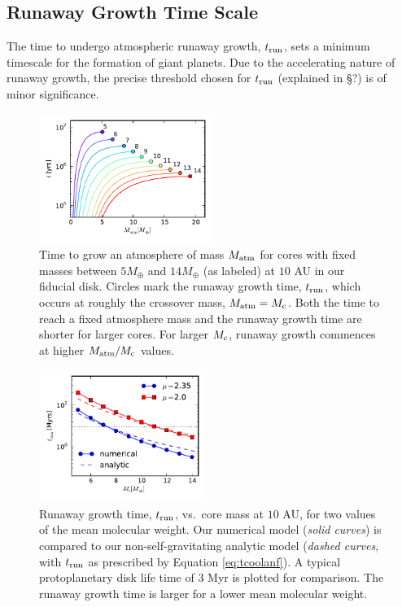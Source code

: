 \documentclass[apj, numberedappendix]{emulateapj}
\newcommand{\co}{_{\rm c}}
\begin{document}
\subsection{Runaway Growth Time Scale}
\label{sec:tcross}
The time to undergo atmospheric runaway growth, $t_{\rm run}$, sets a minimum timescale for the formation of giant planets.  Due to the accelerating nature of runaway growth, the precise threshold chosen for $t_{\rm run}$ (explained in \S ?) is of minor significance.

\begin{figure}[tb]
\hspace{-.1in}
\includegraphics[width=0.5\textwidth]{../../figs/ModelAtmospheres/RadSelfGravPoly/PaperFigs/cumul_coolingtime_vs_Matm_10au_mu235.pdf}
\caption{Time to grow an atmosphere of mass $M_{\rm{atm}}$ for cores with fixed masses between $5 M_{\oplus}$ and $14 M_{\oplus}$ (as labeled) at $10$ AU in our fiducial disk. Circles mark the runaway growth time, $t_{\rm run}$, which occurs at roughly the crossover mass, $M_{\rm{atm}} = M\co$.  Both the time to reach a fixed atmosphere mass and the runaway growth time are shorter for larger cores. For larger $M\co$, runaway growth commences at higher $M_{\rm atm}/M\co$ values.}
\label{fig:tvsM}
\end{figure}

\begin{figure}[htb]
\centering
\includegraphics[width=0.48\textwidth]{../../figs/ModelAtmospheres/RadSelfGravPoly/PaperFigs/coolingtime_vs_Mc_10au.pdf}
\caption{Runaway growth time, $t_{\rm{run}}$, vs.\ core mass at $10$ AU, for two values of the mean molecular weight.  Our numerical model (\emph{solid curves}) is compared to our non-self-gravitating analytic model (\emph{dashed curves}, with $t_{\rm run}$ as prescribed by Equation \ref{eq:tcoolanf}).  A typical protoplanetary disk life time of $3$ Myr is plotted for comparison. The runaway growth time is larger for a lower mean molecular weight.}
\label{fig:tvsMcomp}
\end{figure}
\end{document}
